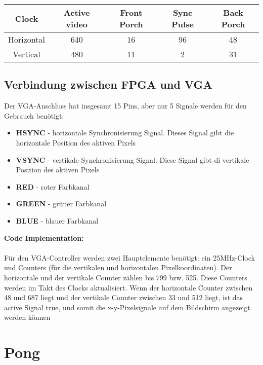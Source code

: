 \documentclass[a4paper, 11pt]{article}
\begin{document}
\begin{center}
\begin{tabular}{|c|c|c|c|c|}
    \hline
    Clock & Active video & Front Porch & Sync Pulse & Back Porch \\ 
    \hline
    Horizontal & 640 & 16 & 96 & 48 \\ 
    \hline
    Vertical & 480 & 11 & 2 & 31 \\ 
    \hline
\end{tabular}
\end{center}

\subsection{Verbindung zwischen FPGA und VGA}                          

    Der VGA-Anschluss hat insgesamt 15 Pins, aber nur 5 Signale werden für den Gebrauch benötigt:
    \begin{itemize}
        \item \textbf{HSYNC} - horizontale Synchronisierung Signal. Dieses Signal gibt die horizontale Position des aktiven Pixels
        \item \textbf{VSYNC} - vertikale Synchronisierung Signal. Diese Signal gibt di vertikale Position des aktiven Pixels
        \item \textbf{RED} - roter Farbkanal
        \item \textbf{GREEN} - grüner Farbkanal
        \item \textbf{BLUE} - blauer Farbkanal
    \end{itemize}
    

    \textbf{Code Implementation:}
    \\
    \\Für den VGA-Controller werden zwei Hauptelemente benötigt: ein 25MHz-Clock und Counters (für die vertikalen und horizontalen Pixelkoordinaten). Der horizontale und der vertikale Counter zählen bis 799 bzw. 525. Diese Counters werden im Takt des Clocks aktualisiert. Wenn der horizontale Counter zwischen 48 und 687 liegt und der vertikale Counter zwischen 33 und 512 liegt, ist das active Signal true, und somit die x-y-Pixelsignale auf dem Bildschirm angezeigt werden können

\section{Pong }  
    
\end{document}
